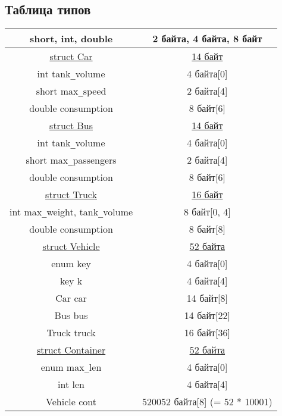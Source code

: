 \documentclass[a4paper]{article}
\begin{document}
\subsection*{Таблица типов}

\begin{tabular}{ |c|c| }
    \hline
    short, int, double & 2 байта, 4 байта, 8 байт \\
    \hline
    \underline{struct Car} & \underline{14 байт} \\
    int tank\verb|_|volume & 4 байта[0] \\
    short max\verb|_|speed & 2 байта[4]\\
    double consumption & 8 байт[6]\\
    \hline
    \underline{struct Bus} & \underline{14 байт} \\
    int tank\verb|_|volume & 4 байта[0] \\
    short max\verb|_|passengers & 2 байта[4]\\
    double consumption & 8 байт[6]\\
    \hline
    \underline{struct Truck} & \underline{16 байт} \\
    int max\verb|_|weight, tank\verb|_|volume & 8 байт[0, 4] \\
    double consumption & 8 байт[8]\\
    \hline
    \underline{struct Vehicle} & \underline{52 байта} \\
    enum key & 4 байта[0] \\
    key k & 4 байта[4] \\
    Car car & 14 байт[8]\\
    Bus bus & 14 байт[22]\\
    Truck truck & 16 байт[36]\\
    \hline
    \underline{struct Container} & \underline{52 байта} \\
    enum max\verb|_|len & 4 байта[0] \\
    int len & 4 байта[4] \\
    Vehicle cont & 520052 байта[8] (= 52 * 10001)\\
    \hline
\end{tabular}
\end{document}
